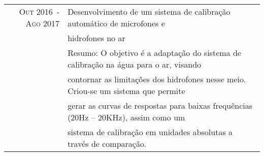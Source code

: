 \documentclass[a4paper,10pt]{article}
\begin{document}
\begin{longtable}{rl}
    \textsc{Out 2016~-~Ago 2017}    & Desenvolvimento de um sistema de calibração automático de microfones e \\
                                    & hidrofones no ar\\ 
                                    &\footnotesize{Resumo: O objetivo é a adaptação do sistema de calibração na água para o ar, visando}\\ 
                                    &\footnotesize{contornar as limitações dos hidrofones nesse meio. Criou-se um sistema que permite}\\ 
                                    &\footnotesize{gerar as curvas de respostas para baixas frequências (20Hz – 20KHz), assim como um}\\ 
                                    &\footnotesize{sistema de calibração em unidades absolutas a través de comparação.}\\
\end{longtable}

\end{document}

